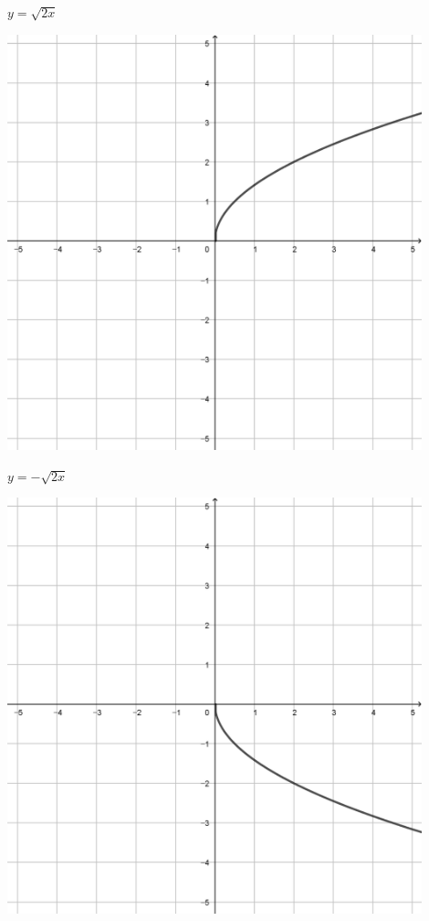 \documentclass[a4paper]{oblivoir}
\begin{document}
\begin{minipage}{0.45\textwidth}\centering
\(y=\sqrt{2x}\)
\par\bigskip\includegraphics[width=0.9\textwidth]{img/22-5}
\end{minipage}
\begin{minipage}{0.45\textwidth}\centering
\(y=-\sqrt{2x}\)
\par\bigskip\includegraphics[width=0.9\textwidth]{img/22-6}
\end{minipage}\bigskip\bigskip\par
\end{document}
